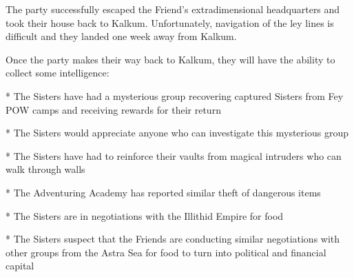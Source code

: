 The party successfully escaped the Friend's extradimensional headquarters and took their house back to Kalkum.
Unfortunately, navigation of the ley lines is difficult and they landed one week away from Kalkum.

Once the party makes their way back to Kalkum, they will have the ability to collect some intelligence:

* The Sisters have had a mysterious group recovering captured Sisters from Fey POW camps and receiving rewards for their return

* The Sisters would appreciate anyone who can investigate this mysterious group

* The Sisters have had to reinforce their vaults from magical intruders who can walk through walls

* The Adventuring Academy has reported similar theft of dangerous items

* The Sisters are in negotiations with the Illithid Empire for food

* The Sisters suspect that the Friends are conducting similar negotiations with other groups from the Astra Sea for food to turn into political and financial capital